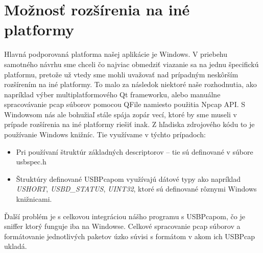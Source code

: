 \section{Možnosť rozšírenia na iné platformy}
Hlavná podporovaná platforma našej aplikácie je Windows. V priebehu samotného návrhu sme chceli čo najviac obmedziť viazanie sa na jednu špecifickú platformu, pretože už vtedy sme mohli uvažovať nad prípadným neskôrším rozšírením na iné platformy. To malo za následok niektoré naše rozhodnutia, ako napríklad výber multiplatformového Qt frameworku, alebo manuálne spracovávanie pcap súborov pomocou QFile namiesto použitia Npcap API. S Windowsom nás ale bohužiaľ stále spája zopár vecí, ktoré by sme museli v prípade rozšírenia na iné platformy riešiť inak. Z hľadiska zdrojového kódu to je používanie Windows knižníc. Tie využívame v týchto prípadoch:
\begin{itemize}
\item Pri používaní štruktúr základných descriptorov -- tie sú definované v súbore usbspec.h
\item Štruktúry definované USBPcapom využívajú dátové typy ako napríklad \textit{USHORT}, \textit{USBD\_STATUS}, \textit{UINT32}, ktoré sú definované rôznymi Windows knižnicami.
\end{itemize}

Ďalší problém je s celkovou integráciou nášho programu s USBPcapom, čo je sniffer ktorý funguje iba na Windowse. Celkové spracovanie pcap súborov a formátovanie jednotlivých paketov úzko súvisi s formátom v akom ich USBPcap ukladá.